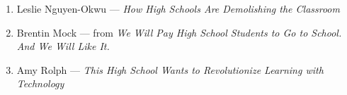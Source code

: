 \documentclass[12pt]{article}
\begin{document}
\begin{enumerate}
        \begin{justify}
        \end{justify}

      \item Leslie Nguyen-Okwu — \textit{How High Schools Are Demolishing the Classroom}

        \begin{justify}
        \end{justify}

      \item Brentin Mock — from \textit{We Will Pay High School Students to Go to School. And We Will Like It.}

        \begin{justify}
        \end{justify}

      \item Amy Rolph — \textit{This High School Wants to Revolutionize Learning with Technology}

        \begin{justify}
        \end{justify}

    \end{enumerate}
\end{document}
